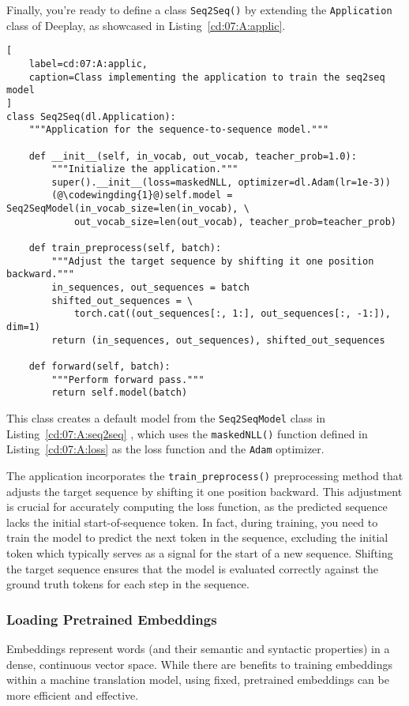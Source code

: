 Finally, you're ready to define a class \lstinline{Seq2Seq()} by extending the \lstinline{Application} class of Deeplay, as showcased in Listing~\ref{cd:07:A:applic}.
\begin{lstlisting}[
    label=cd:07:A:applic,
    caption=Class implementing the application to train the seq2seq model
]
class Seq2Seq(dl.Application):
    """Application for the sequence-to-sequence model."""

    def __init__(self, in_vocab, out_vocab, teacher_prob=1.0):
        """Initialize the application."""
        super().__init__(loss=maskedNLL, optimizer=dl.Adam(lr=1e-3))
        (@\codewingding{1}@)self.model = Seq2SeqModel(in_vocab_size=len(in_vocab), \
            out_vocab_size=len(out_vocab), teacher_prob=teacher_prob)

    def train_preprocess(self, batch):
        """Adjust the target sequence by shifting it one position backward."""
        in_sequences, out_sequences = batch
        shifted_out_sequences = \
            torch.cat((out_sequences[:, 1:], out_sequences[:, -1:]), dim=1)
        return (in_sequences, out_sequences), shifted_out_sequences
    
    def forward(self, batch):
        """Perform forward pass."""
        return self.model(batch)
\end{lstlisting}
This class creates a default model from the \lstinline{Seq2SeqModel} class in Listing~\ref{cd:07:A:seq2seq} , which uses the \lstinline{maskedNLL()} function defined in Listing~\ref{cd:07:A:loss} as the loss function and the \lstinline{Adam} optimizer.

The application incorporates the \lstinline{train_preprocess()} preprocessing method that adjusts the target sequence by shifting it one position backward. This adjustment is crucial for accurately computing the loss function, as the predicted sequence lacks the initial start-of-sequence token.
In fact, during training, you need to train the model to predict the next token in the sequence, excluding the initial token which typically serves as a signal for the start of a new sequence. Shifting the target sequence ensures that the model is evaluated correctly against the ground truth tokens for each step in the sequence.

\subsubsection{Loading Pretrained Embeddings}

Embeddings represent words (and their semantic and syntactic properties) in a dense, continuous vector space. While there are benefits to training embeddings within a machine translation model, using fixed, pretrained embeddings can be more efficient and effective. 

